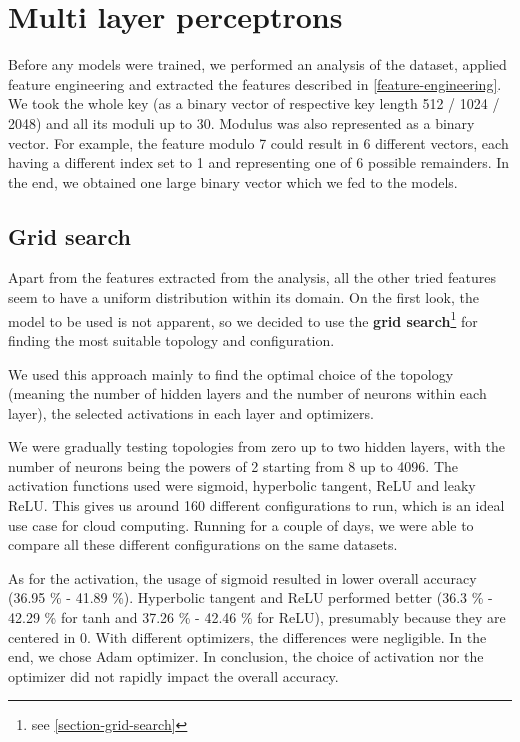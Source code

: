 \section{Multi layer perceptrons}

Before any models were trained, we performed an analysis of the dataset, applied feature engineering and extracted the features described in \autoref{feature-engineering}. We took the whole key (as a binary vector of respective key length 512 / 1024 / 2048) and all its moduli up to 30. Modulus was also represented as a binary vector. For example, the feature modulo 7 could result in 6 different vectors, each having a different index set to 1 and representing one of 6 possible remainders. In the end, we obtained one large binary vector which we fed to the models.

\subsection*{Grid search}

Apart from the features extracted from the analysis, all the other tried features seem to have a uniform distribution within its domain. On the first look, the model to be used is not apparent, so we decided to use the \textbf{grid search}\footnote{see \autoref{section-grid-search}} for finding the most suitable topology and configuration. 

We used this approach mainly to find the optimal choice of the topology (meaning the number of hidden layers and the number of neurons within each layer), the selected activations in each layer and optimizers.

We were gradually testing topologies from zero up to two hidden layers, with the number of neurons being the powers of 2 starting from 8 up to 4096. The activation functions used were sigmoid, hyperbolic tangent, ReLU and leaky ReLU. This gives us around 160 different configurations to run, which is an ideal use case for cloud computing. Running for a couple of days, we were able to compare all these different configurations on the same datasets.

As for the activation, the usage of sigmoid resulted in lower overall accuracy (36.95 \% - 41.89 \%). Hyperbolic tangent and ReLU performed better (36.3 \% - 42.29 \% for tanh and 37.26 \% - 42.46 \% for ReLU), presumably because they are centered in 0. With different optimizers, the differences were negligible. In the end, we chose Adam optimizer. In conclusion, the choice of activation nor the optimizer did not rapidly impact the overall accuracy. 

